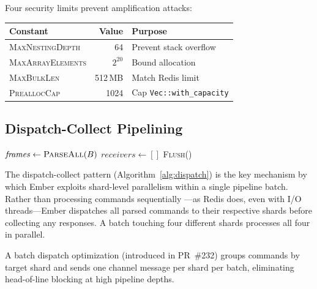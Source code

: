 \documentclass[conference]{IEEEtran}
\begin{document}
Four security limits prevent amplification attacks:

\smallskip
\begin{tabular}{@{}lrl@{}}
\toprule
\textbf{Constant} & \textbf{Value} & \textbf{Purpose} \\
\midrule
\textsc{MaxNestingDepth} & 64 & Prevent stack overflow \\
\textsc{MaxArrayElements} & $2^{20}$ & Bound allocation \\
\textsc{MaxBulkLen} & 512\,MB & Match Redis limit \\
\textsc{PreallocCap} & 1024 & Cap \texttt{Vec::with\_capacity} \\
\bottomrule
\end{tabular}


\subsection{Dispatch-Collect Pipelining}

\begin{algorithm}[t]
\DontPrintSemicolon
\SetAlgoLined
{}
$\mathit{frames} \gets \textsc{ParseAll}(B)$\;
$\mathit{receivers} \gets []$\;
\textsc{Flush}()\;
\caption{Dispatch-Collect Pipeline}
\label{alg:dispatch}
\end{algorithm}

The dispatch-collect pattern (Algorithm~\ref{alg:dispatch}) is the
key mechanism by which Ember exploits shard-level parallelism within
a single pipeline batch. Rather than processing commands sequentially
---as Redis does, even with I/O threads---Ember dispatches all parsed
commands to their respective shards before collecting any responses.
A batch touching four different shards processes all four in parallel.

A batch dispatch optimization (introduced in PR~\#232) groups
commands by target shard and sends one channel message per shard per
batch, eliminating head-of-line blocking at high pipeline depths.
\end{document}
